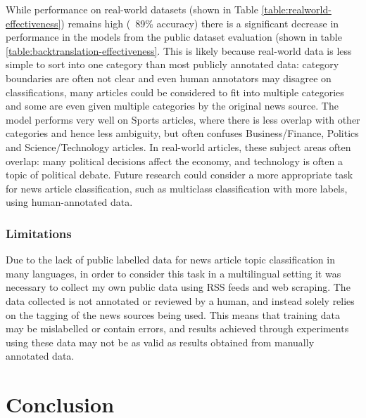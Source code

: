 \documentclass{l4proj}
\begin{document}
While performance on real-world datasets (shown in Table \ref{table:realworld-effectiveness}) remains high (~89\% accuracy) there is a significant decrease in performance in the models from the public dataset evaluation (shown in table \ref{table:backtranslation-effectiveness}. This is likely because real-world data is less simple to sort into one category than most publicly annotated data: category boundaries are often not clear and even human annotators may disagree on classifications, many articles could be considered to fit into multiple categories and some are even given multiple categories by the original news source. The model performs very well on Sports articles, where there is less overlap with other categories and hence less ambiguity, but often confuses Business/Finance, Politics and Science/Technology articles. In real-world articles, these subject areas often overlap: many political decisions affect the economy, and technology is often a topic of political debate. Future research could consider a more appropriate task for news article classification, such as multiclass classification with more labels, using human-annotated data.

\subsection{Limitations}
Due to the lack of public labelled data for news article topic classification in many languages, in order to consider this task in a multilingual setting it was necessary to collect my own public data using RSS feeds and web scraping. The data collected is not annotated or reviewed by a human, and instead solely relies on the tagging of the news sources being used. This means that training data may be mislabelled or contain errors, and results achieved through experiments using these data may not be as valid as results obtained from manually annotated data. \par

\chapter{Conclusion}    
\end{document}
